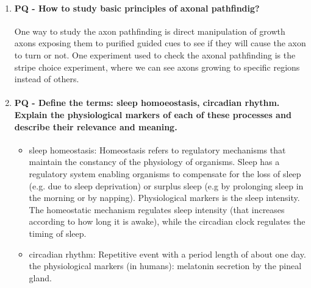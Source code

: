 \documentclass[12pt,article,oneside,a4paper]{memoir}
\begin{document}
\begin{enumerate}
\item \paragraph{PQ - How to study basic principles of axonal pathfindig?}
One way to study the axon pathfinding is direct manipulation of growth axons exposing them to purified guided cues to see if they will cause the axon to turn or not. One experiment used to check the axonal pathfinding is the stripe choice experiment, where we can see axons growing to specific regions instead of others.

\item \paragraph{PQ - Define the terms: sleep homoeostasis, circadian rhythm. Explain the physiological markers of each of these processes and describe their relevance and meaning.} 
\begin{itemize}
\item sleep homeostasis: Homeostasis refers to regulatory mechanisms that maintain the constancy of the physiology of organisms. Sleep has a regulatory system enabling organisms to compensate for the loss of sleep (e.g. due to sleep deprivation) or surplus sleep (e.g by prolonging sleep in the morning or by napping). Physiological markers is the sleep intensity. The homeostatic mechanism regulates sleep intensity (that increases according to how long it is awake), while the circadian clock regulates the timing of sleep.
\item circadian rhythm: Repetitive event with a period length of about one day. the physiological markers (in humans): melatonin secretion by the pineal gland.
\end{itemize}
\end{enumerate}

\end{document}
